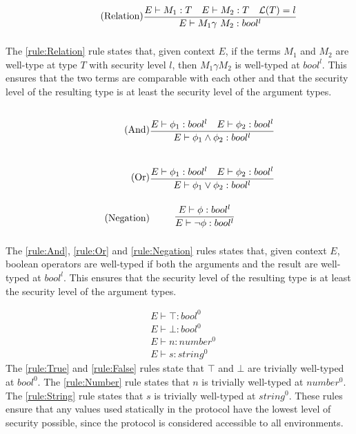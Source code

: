 \begin{align*}
\tag{Relation}\label{rule:Relation} &\infrule{E\vdash M_1:T\quad E\vdash M_2:T\quad\level{T}=l}{E\vdash M_1 \gamma\ M_2:bool^{l}}
\end{align*}
The \ref{rule:Relation} rule states that, given context $E$, if the terms $M_1$ and $M_2$ are well-type at type $T$ with security level $l$, then $M_1\gamma M_2$ is well-typed at $bool^l$. This ensures that the two terms are comparable with each other and that the security level of the resulting type is at least the security level of the argument types.

\begin{align*}
\tag{And}\label{rule:And} &\infrule{E\vdash \phi_1:bool^l\quad E\vdash \phi_2:bool^l}{E\vdash \phi _1 \land \phi _2:bool^{l}}\\
\tag{Or}\label{rule:Or} &\infrule{E\vdash \phi_1:bool^l\quad E\vdash \phi_2:bool^l}{E\vdash \phi _1 \lor \phi _2:bool^{l}}\\
\tag{Negation}\label{rule:Negation} &\infrule{E\vdash \phi :bool^l }{E\vdash \neg \phi :bool^l}
\end{align*}

The \ref{rule:And}, \ref{rule:Or} and \ref{rule:Negation} rules states that, given context $E$, boolean operators are well-typed if both the arguments and the result are well-typed at $bool^l$. This ensures that the security level of the resulting type is at least the security level of the argument types.

\begin{align*}
\tag{True}\label{rule:True} &E\vdash\top:bool^0\\
\tag{False}\label{rule:False} &E\vdash\bot:bool^0\\
\tag{Number}\label{rule:Number} &E\vdash n:{number^0}\\
\tag{String}\label{rule:String} &E\vdash s:{string^0}
\end{align*}
The \ref{rule:True} and \ref{rule:False} rules state that $\top$ and $\bot$ are trivially well-typed at $bool^0$.
The \ref{rule:Number} rule states that $n$ is trivially well-typed at $number^0$.
The \ref{rule:String} rule states that $s$ is trivially well-typed at $string^0$.
These rules ensure that any values used statically in the protocol have the lowest level of security possible, since the protocol is considered accessible to all environments.

\FloatBarrier